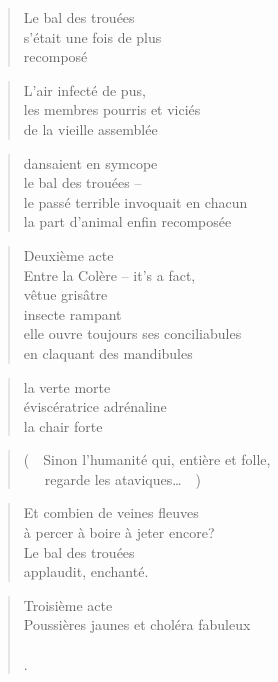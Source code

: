  \begin{verse}
    Le bal des trouées\\
    s’était une fois de plus\\
    recomposé
  \end{verse}
  \begin{verse}
    L’air infecté de pus,\\
    les membres pourris et viciés\\
    de la vieille assemblée
  \end{verse}
  \begin{verse}
    dansaient en symcope\\
    le bal des trouées --\\
    le passé terrible invoquait en chacun\\
    la part d’animal enfin
    recomposée
  \end{verse}
  \begin{verse}
    Deuxième acte\\
    Entre la Colère -- it’s a fact,\\
    vêtue grisâtre\\
    insecte rampant\\
    elle ouvre toujours ses conciliabules\\
    en claquant des mandibules
  \end{verse}
  \begin{verse}
    la verte morte\\
    éviscératrice adrénaline\\
    la chair forte\\
  \end{verse}
  \begin{verse}
    (~~Sinon l’humanité qui, entière et folle,\\
    ~~~regarde les ataviques…~~)
  \end{verse}
  \begin{verse}
    Et combien de veines fleuves\\
    à percer à boire à jeter encore?\\
    Le bal des trouées\\
    applaudit, enchanté.
  \end{verse}
  \begin{verse}
    Troisième acte\\
    Poussières jaunes et choléra fabuleux\\
    \\
    .
  \end{verse}
